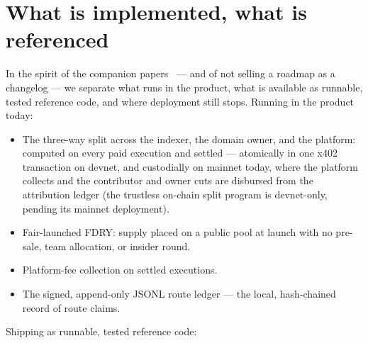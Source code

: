 \documentclass[11pt]{article}
\begin{document}
\section{What is implemented, what is referenced}

In the spirit of the companion papers~\cite{wedge,security} --- and of not selling a
roadmap as a changelog --- we separate what runs in the product, what is available
as runnable, tested reference code, and where deployment still stops. Running in
the product today:
\begin{itemize}[leftmargin=1.4em]
\item The three-way split across the indexer, the domain owner, and the
platform: computed on every paid execution and settled --- atomically in one
x402~\cite{x402} transaction on devnet, and custodially on mainnet today, where
the platform collects and the contributor and owner cuts are disbursed from the
attribution ledger (the trustless on-chain split program is devnet-only, pending
its mainnet deployment).
\item Fair-launched FDRY: supply placed on a public pool at launch with no
pre-sale, team allocation, or insider round.
\item Platform-fee collection on settled executions.
\item The signed, append-only JSONL route ledger --- the local, hash-chained
record of route claims.
\end{itemize}
Shipping as runnable, tested reference code:
\end{document}
